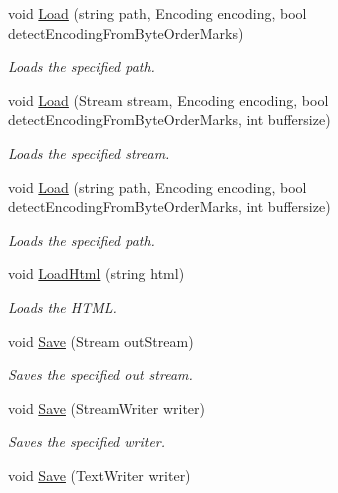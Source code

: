 \begin{DoxyCompactItemize}
void \hyperlink{class_html_agility_pack_1_1_mixed_code_document_a363b56f6cc787f5faf24ddf0fde47f4a}{Load} (string path, Encoding encoding, bool detect\+Encoding\+From\+Byte\+Order\+Marks)
\begin{DoxyCompactList}\small\item\em Loads the specified path. \end{DoxyCompactList}\item 
void \hyperlink{class_html_agility_pack_1_1_mixed_code_document_a68233a50b9b68366828831ab1a36ad92}{Load} (Stream stream, Encoding encoding, bool detect\+Encoding\+From\+Byte\+Order\+Marks, int buffersize)
\begin{DoxyCompactList}\small\item\em Loads the specified stream. \end{DoxyCompactList}\item 
void \hyperlink{class_html_agility_pack_1_1_mixed_code_document_a2499be15fa6ad7232cd0933073611031}{Load} (string path, Encoding encoding, bool detect\+Encoding\+From\+Byte\+Order\+Marks, int buffersize)
\begin{DoxyCompactList}\small\item\em Loads the specified path. \end{DoxyCompactList}\item 
void \hyperlink{class_html_agility_pack_1_1_mixed_code_document_a77a5056a6b5cdf3f622eb9b138ade1ad}{Load\+Html} (string html)
\begin{DoxyCompactList}\small\item\em Loads the H\+T\+ML. \end{DoxyCompactList}\item 
void \hyperlink{class_html_agility_pack_1_1_mixed_code_document_a56b538603bad61b7a7cbf504c2ffe10d}{Save} (Stream out\+Stream)
\begin{DoxyCompactList}\small\item\em Saves the specified out stream. \end{DoxyCompactList}\item 
void \hyperlink{class_html_agility_pack_1_1_mixed_code_document_a2e68480b889686b9834c9905408c38ef}{Save} (Stream\+Writer writer)
\begin{DoxyCompactList}\small\item\em Saves the specified writer. \end{DoxyCompactList}\item 
void \hyperlink{class_html_agility_pack_1_1_mixed_code_document_ab52e92900a9d94cffe7fe941186a8971}{Save} (Text\+Writer writer)

\end{DoxyCompactItemize}
